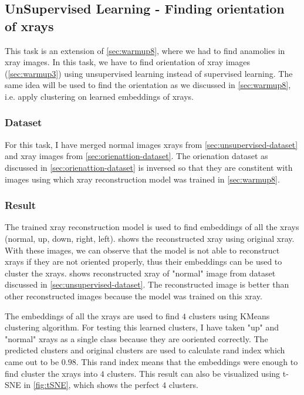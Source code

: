 \subsection{UnSupervised Learning - Finding orientation of xrays}
\label{sec:warmup9}

    This task is an extension of \cref{sec:warmup8}, where we had to find anamolies in xray images. In this task, we have to find orientation of xray images (\cref{sec:warmup3}) using unsupervised learning instead of supervised learning. The same idea will be used to find the orientation as we discussed in \cref{sec:warmup8}, i.e. apply clustering on learned embeddings of xrays.

\subsubsection{Dataset}
  
  For this task, I have merged normal images xrays from \cref{sec:unsupervised-dataset} and xray images from \cref{sec:orienattion-dataset}. The orienation dataset as discussed in \cref{sec:orienattion-dataset} is inversed so that they are constitent with images using which xray reconstruction model was trained in \cref{sec:warmup8}. 

\subsubsection{Result}
 
  The trained xray reconstruction model is used to find embeddings of all the xrays (normal, up, down, right, left).  shows the reconstructed xray using original xray. With these images, we can observe that the model is not able to reconstruct xrays if they are not oriented properly, thus their embeddings can be used to cluster the xrays.  shows reconstructed xray of "normal" image from dataset discussed in \cref{sec:unsupervised-dataset}. The reconstructed image is better than other reconstructed images because the model was trained on this xray.

  The embeddings of all the xrays are used to find $4$ clusters using KMeans clustering algorithm. For testing this learned clusters, I have taken "up" and "normal" xrays as a single class because they are ooriented correctly. The predicted clusters and original clusters are used to calculate rand index which came out to be $0.98$. This rand index means that the embeddings were enough to find cluster the xrays into $4$ clusters. This result can also be visualized using t-SNE in \cref{fig:tSNE}, which shows the perfect $4$ clusters.

